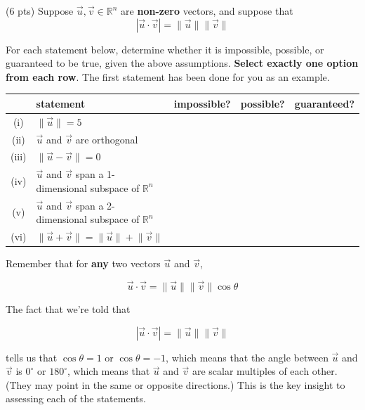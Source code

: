 \documentclass[11pt]{article}
\begin{document}
\newpage

\begin{prob}
\begin{subprob}(6 pts) Suppose $\vec u, \vec v \in \mathbb{R}^n$ are \textbf{non-zero} vectors, and suppose that
$$| \vec u \cdot \vec v | = \lVert \vec u \rVert \lVert \vec v \rVert$$

For each statement below, determine whether it is impossible, possible, or guaranteed to be true, given the above assumptions. \textbf{Select exactly one option from each row}. The first statement has been done for you as an example.

\begin{center}
\renewcommand{\arraystretch}{1.4}
\begin{tabular}{|c|p{8.2cm}|c|c|c|}
\hline
 & \textbf{statement} & \textbf{impossible?} & \textbf{possible?} & \textbf{guaranteed?} \\
\hline
(i) & $\lVert \vec u \rVert = 5$ & \bubble{} & \filledbubble{} & \bubble{} \\
\hline
(ii) & $\vec u$ and $\vec v$ are orthogonal & \correctbubble{} & \bubble{} & \bubble{} \\
\hline
(iii) & $\lVert \vec u - \vec v \rVert = 0$ & \bubble{} & \correctbubble{} & \bubble{} \\
\hline
(iv) & $\vec u$ and $\vec v$ span a 1-dimensional subspace of $\mathbb{R}^n$ & \bubble{} & \bubble{} & \correctbubble{} \\
\hline
(v) & $\vec u$ and $\vec v$ span a 2-dimensional subspace of $\mathbb{R}^n$ & \correctbubble{} & \bubble{} & \bubble{} \\
\hline
(vi) & $\lVert \vec u + \vec v \rVert = \lVert \vec u \rVert + \lVert \vec v \rVert$ & \bubble{} & \correctbubble{} & \bubble{} \\
\hline
\end{tabular}
\end{center}

\begin{solution}
Remember that for \textbf{any} two vectors $\vec u$ and $\vec v$,

$$\vec u \cdot \vec v = \lVert \vec u \rVert \lVert \vec v \rVert \cos \theta$$

The fact that we're told that

$$| \vec u \cdot \vec v | = \lVert \vec u \rVert \lVert \vec v \rVert$$

tells us that $\cos \theta = 1$ or $\cos \theta = -1$, which means that the angle between $\vec u$ and $\vec v$ is $0^\circ$ or $180^\circ$, which means that $\vec u$ and $\vec v$ are scalar multiples of each other. (They may point in the same or opposite directions.) This is the key insight to assessing each of the statements.


\end{solution}
\end{subprob}
\end{prob}
\end{document}

